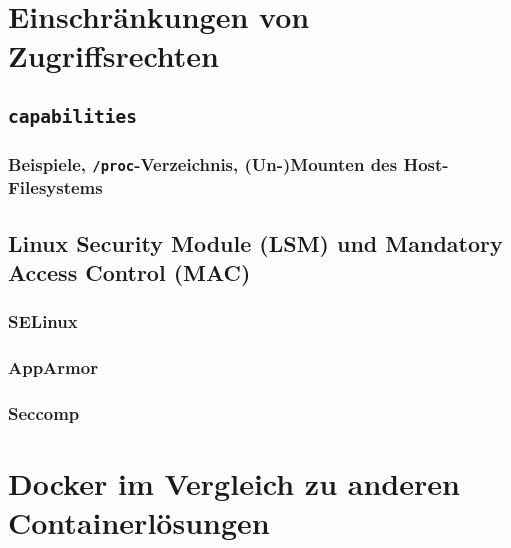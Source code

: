 \documentclass[../main.tex]{subfiles}
\begin{document}
  \section{Einschränkungen von Zugriffsrechten}
    \subsection{\texttt{capabilities}}
      \subsubsection{Beispiele, \texttt{/proc}-Verzeichnis, (Un-)Mounten des Host-Filesystems}

    \subsection{Linux Security Module (LSM) und Mandatory Access Control (MAC)}
  		\subsubsection{SELinux}
      \subsubsection{AppArmor}
      \subsubsection{Seccomp}

	\section{Docker im Vergleich zu anderen Containerlösungen}
\end{document}
